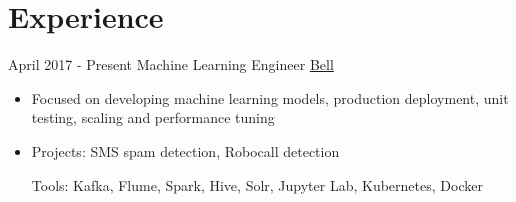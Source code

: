\documentclass[letterpaper]{twentysecondcv} %
\begin{document}
\makeprofile %


\section{Experience}

\begin{twenty} %
\twentyitem
    	{April 2017 -}
		{Present}
        {Machine Learning Engineer}
        {\href{http://www.bell.ca/}{Bell}}
        {}
        {\begin{itemize}
        \item Focused on developing machine learning models, production deployment,  unit testing, scaling and performance tuning
        \item Projects: SMS spam detection, Robocall detection 
        
        Tools: Kafka, Flume, Spark, Hive, Solr, Jupyter Lab, Kubernetes, Docker
        

\end{itemize}}
\end{twenty}
\end{document}
